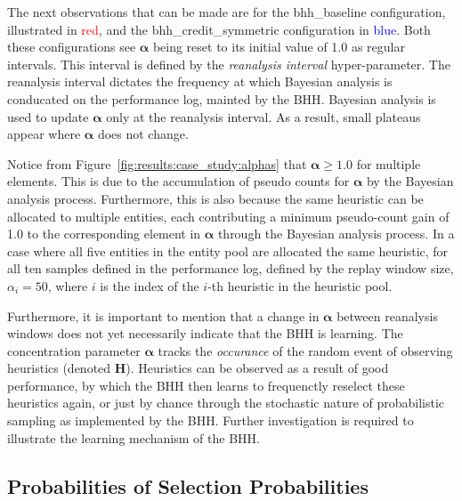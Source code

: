 The next observations that can be made are for the bhh\_baseline configuration, illustrated in \textcolor{red}{red}, and the bhh\_credit\_symmetric configuration in \textcolor{blue}{blue}. Both these configurations see $\boldsymbol{\alpha}$ being reset to its initial value of 1.0 as regular intervals. This interval is defined by the \textit{reanalysis interval} hyper-parameter. The reanalysis interval dictates the frequency at which Bayesian analysis is conducated on the performance log, mainted by the \acs{BHH}. Bayesian analysis is used to update $\boldsymbol{\alpha}$ only at the reanalysis interval. As a result, small plateaus appear where $\boldsymbol{\alpha}$ does not change.

Notice from Figure~\ref{fig:results:case_study:alphas} that $\boldsymbol{\alpha} \geq 1.0$ for multiple elements. This is due to the accumulation of pseudo counts for $\boldsymbol{\alpha}$ by the Bayesian analysis process. Furthermore, this is also because the same heuristic can be allocated to multiple entities, each contributing a minimum pseudo-count gain of 1.0 to the corresponding element in $\boldsymbol{\alpha}$ through the Bayesian analysis process. In a case where all five entities in the entity pool are allocated the same heuristic, for all ten samples defined in the performance log, defined by the replay window size, $\alpha_{i} = 50$, where $i$ is the index of the $i$-th heuristic in the heuristic pool.

Furthermore, it is important to mention that a change in $\boldsymbol{\alpha}$ between reanalysis windows does not yet necessarily indicate that the \acs{BHH} is learning. The concentration parameter $\boldsymbol{\alpha}$ tracks the \textit{occurance} of the random event of observing heuristics (denoted $\boldsymbol{{H}}$). Heuristics can be observed as a result of good performance, by which the \acs{BHH} then learns to frequenctly reselect these heuristics again, or just by chance through the stochastic nature of probabilistic sampling as implemented by the \acs{BHH}. Further investigation is required to illustrate the learning mechanism of the \acs{BHH}.




\subsection{Probabilities of Selection Probabilities}\label{sec:results:case_study:probs_of_select_probs}

